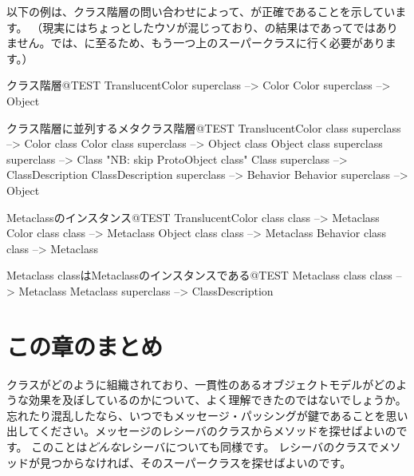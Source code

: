 \documentclass[a4paper,10pt,twoside]{book}
\begin{document}
以下の例は、クラス階層の問い合わせによって、が正確であることを示しています。
（現実にはちょっとしたウソが混じっており、の結果はであってではありません。\pharo では、に至るため、もう一つ上のスーパークラスに行く必要があります。）

\begin{example}{クラス階層}{@TEST}
TranslucentColor superclass --> Color
Color superclass                   --> Object
\end{example}

\begin{example}{クラス階層に並列するメタクラス階層}{@TEST}
TranslucentColor class superclass   --> Color class
Color class superclass                     --> Object class
Object class superclass superclass --> Class    "NB: skip ProtoObject class"
Class superclass                              --> ClassDescription
ClassDescription superclass            --> Behavior
Behavior superclass                         --> Object
\end{example}

\begin{example}{Metaclassのインスタンス}{@TEST}
TranslucentColor class class --> Metaclass
Color class class                   --> Metaclass
Object class class                 --> Metaclass
Behavior class class              --> Metaclass
\end{example}
\begin{example}{Metaclass classはMetaclassのインスタンスである}{@TEST}
Metaclass class class --> Metaclass
Metaclass superclass --> ClassDescription
\end{example}

\section{この章のまとめ}
クラスがどのように組織されており、一貫性のあるオブジェクトモデルがどのような効果を及ぼしているのかについて、よく理解できたのではないでしょうか。忘れたり混乱したなら、いつでもメッセージ・パッシングが鍵であることを思い出してください。メッセージのレシーバのクラスからメソッドを探せばよいのです。
このことは\emph{どんな}レシーバについても同様です。
レシーバのクラスでメソッドが見つからなければ、そのスーパークラスを探せばよいのです。
\end{document}
